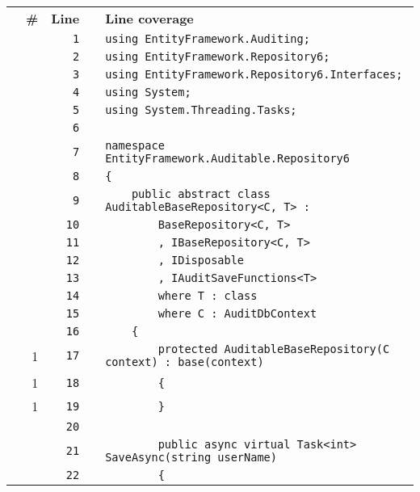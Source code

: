 \documentclass[a4paper,10pt]{article}
\begin{document}
\begin{longtable}[l]{lrrll}
\textbf{} & \textbf{\#} & \textbf{Line} & \textbf{} & \textbf{Line coverage}\\
\cellcolor{gray} &  & \verb~1~ & & \verb~using EntityFramework.Auditing;~\\
\cellcolor{gray} &  & \verb~2~ & & \verb~using EntityFramework.Repository6;~\\
\cellcolor{gray} &  & \verb~3~ & & \verb~using EntityFramework.Repository6.Interfaces;~\\
\cellcolor{gray} &  & \verb~4~ & & \verb~using System;~\\
\cellcolor{gray} &  & \verb~5~ & & \verb~using System.Threading.Tasks;~\\
\cellcolor{gray} &  & \verb~6~ & & \verb~~\\
\cellcolor{gray} &  & \verb~7~ & & \verb~namespace EntityFramework.Auditable.Repository6~\\
\cellcolor{gray} &  & \verb~8~ & & \verb~{~\\
\cellcolor{gray} &  & \verb~9~ & & \verb~    public abstract class AuditableBaseRepository<C, T> :~\\
\cellcolor{gray} &  & \verb~10~ & & \verb~        BaseRepository<C, T>~\\
\cellcolor{gray} &  & \verb~11~ & & \verb~        , IBaseRepository<C, T>~\\
\cellcolor{gray} &  & \verb~12~ & & \verb~        , IDisposable~\\
\cellcolor{gray} &  & \verb~13~ & & \verb~        , IAuditSaveFunctions<T>~\\
\cellcolor{gray} &  & \verb~14~ & & \verb~        where T : class~\\
\cellcolor{gray} &  & \verb~15~ & & \verb~        where C : AuditDbContext~\\
\cellcolor{gray} &  & \verb~16~ & & \verb~    {~\\
\cellcolor{green} & 1 & \verb~17~ & & \verb~        protected AuditableBaseRepository(C context) : base(context)~\\
\cellcolor{green} & 1 & \verb~18~ & & \verb~        {~\\
\cellcolor{green} & 1 & \verb~19~ & & \verb~        }~\\
\cellcolor{gray} &  & \verb~20~ & & \verb~~\\
\cellcolor{gray} &  & \verb~21~ & & \verb~        public async virtual Task<int> SaveAsync(string userName)~\\
\cellcolor{gray} &  & \verb~22~ & & \verb~        {~\\

\end{longtable}
\end{document}
